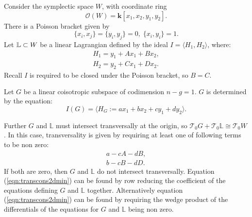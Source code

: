     \begin{ex}    
    Consider the symplectic space \(W\), with coordinate ring 
    \[ \mathcal{O}(W) =   \mathbf{k}[x_1,x_2,y_1,y_2].\] 
    There is a Poisson bracket given by 
    \[\{x_i,x_j\}=\{y_i,y_j\}=0, \; \{x_i,y_i\}=1 .\] 
    Let \( \mathbb{L} \subset W \) be a linear Lagrangian defined by the ideal \(I = \langle H_1, H_2\rangle\), where:
    \begin{align*}
        H_1 = y_1 + A x_1 +  B x_2,    \\
        H_2 = y_2 +  C x_1 + D x_2. 
    \end{align*}
    Recall \( I\) is required to be closed under the Poisson bracket, so \(B=C\).
    
    Let \(G\) be a linear coisotropic subspace of codimension \(n-g=1\). \(G\) is determined by the equation:
    \[ I(G) = \langle H_G :=a x_1 + b x_2 + c y_1 + d y_2 \rangle.\]
    \end{ex}
    
    
    Further \(G\) and \( \mathbb{L}\) must intersect transversally at the origin, so \( \mathcal{T}_0 G+ \mathcal{T}_0{\mathbb{L}} \cong \mathcal{T}_0W\). In this case, transversality is given by requiring at least one of following terms to be non zero:
    \begin{align}
    \label{eqn:transcons2dmin}
    a - cA - dB, \\ 
    b - cB-dD.
    \end{align}
    If both are zero, then \(G\) and \( \mathbb{L}\) do not intersect transversally. Equation (\ref{eqn:transcons2dmin}) can be found by row reducing the coefficient of the equations defining \(G\) and \( \mathbb{L}\) together. Alternatively equation (\ref{eqn:transcons2dmin}) can be found by requiring the wedge product of the differentials of the equations for \(G\) and \( \mathbb{L}\) being non zero. 
    
